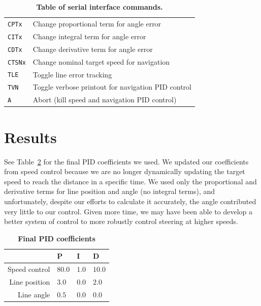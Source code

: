 \documentclass[letterpaper, 11pt]{article}
\begin{document}
\begin{enumerate}[label=\textbf{\arabic*.}]
\begin{table}[ht]
\begin{tabular}{@{}ll@{}}
        \texttt{CPTx} & Change proportional term for angle error \\
        \texttt{CITx} & Change integral term for angle error \\
        \texttt{CDTx} & Change derivative term for angle error \\
        \texttt{CTSNx} & Change nominal target speed for navigation \\
        \texttt{TLE} & Toggle line error tracking \\
        \texttt{TVN} & Toggle verbose printout for navigation PID control \\ \midrule
        \texttt{A} & Abort (kill speed and navigation PID control) \\ \bottomrule
    \end{tabular}
    \caption{\textbf{Table of serial interface commands.}}
    \label{tbl:commands}
\end{table}

\section{Results}
See Table~\ref{tbl:pid} for the final PID coefficients we used. We updated our coefficients from speed control because we are no longer dynamically updating the target speed to reach the distance in a specific time. We used only the proportional and derivative terms for line position and angle (no integral terms), and unfortunately, despite our efforts to calculate it accurately, the angle contributed very little to our control. Given more time, we may have been able to develop a better system of control to more robustly control steering at higher speeds.
\begin{table}[ht]
    \centering
    \begin{tabular}{@{}rlll@{}}
        \toprule
        & \textbf{P} & \textbf{I} & \textbf{D} \\ \midrule
        Speed control & $80.0$ & $1.0$ & $10.0$ \\
        Line position & $3.0$ & $0.0$ & $2.0$ \\
        Line angle & $0.5$ & $0.0$ & $0.0$ \\ \bottomrule
    \end{tabular}
    \caption{\textbf{Final PID coefficients}}
    \label{tbl:pid}
\end{table}


\end{enumerate}
\end{document}
